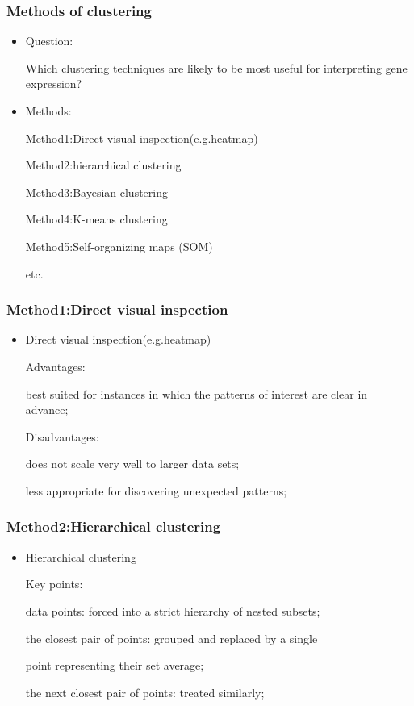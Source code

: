        


\begin{frame}
    \frametitle{Methods of clustering}
    \begin{itemize}
      \item Question:
   
    Which clustering techniques are likely to be most useful for interpreting gene expression?

      \item Methods:
    
    Method1:Direct visual inspection(e.g.heatmap)

    Method2:hierarchical clustering
    
    Method3:Bayesian clustering
         
    Method4:K-means clustering
         
    Method5:Self-organizing maps (SOM)

    etc.
    \end{itemize}
\end{frame}

\begin{frame}
    \frametitle{Method1:Direct visual inspection}
    \begin{itemize}
      \item Direct visual inspection(e.g.heatmap)

          Advantages: 

              best suited for instances in which the patterns of interest are clear in advance;

          Disadvantages:

              does not scale very well to larger data sets;

              less appropriate for discovering unexpected patterns;
    \end{itemize}
\end{frame}

\begin{frame}
    \frametitle{Method2:Hierarchical clustering}
    \begin{itemize}
      \item Hierarchical clustering

    Key points:

    data points: forced into a strict hierarchy of nested subsets;

    the closest pair of points: grouped and replaced by a single
    
    point representing their set average;

    the next closest pair of points: treated similarly;
    \end{itemize}
    
\end{frame}

